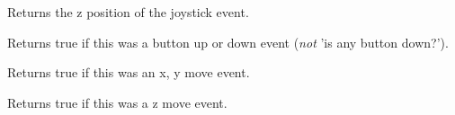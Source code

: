 
Returns the z position of the joystick event.

\label{wxjoystickeventisbutton}


Returns true if this was a button up or down event ({\it not} 'is any button down?').

\label{wxjoystickeventismove}


Returns true if this was an x, y move event.

\label{wxjoystickeventiszmove}


Returns true if this was a z move event.

